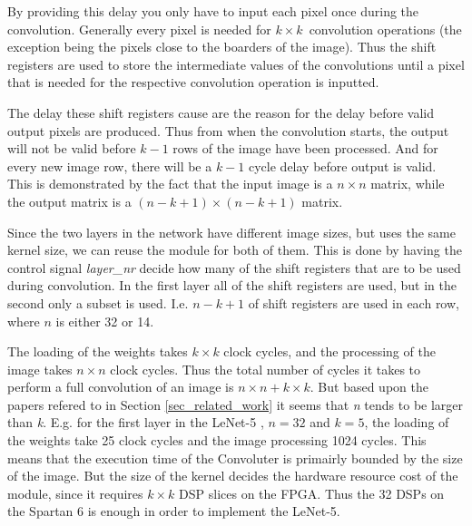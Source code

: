 By providing this delay you only have to input each pixel once during the convolution. Generally every pixel is needed for $ k \times k $ convolution operations (the exception being the pixels close to the boarders of the image). Thus the shift registers are used to store the intermediate values of the convolutions until a pixel that is needed for the respective convolution operation is inputted. 

The delay these shift registers cause are the reason for the delay before valid output pixels are produced. Thus from when the convolution starts, the output will not be valid before $ k-1 $ rows of the image have been processed. And for every new image row, there will be a $ k-1 $ cycle delay before output is valid. This is demonstrated by the fact that the input image is a $ n \times n $ matrix, while the output matrix is a $ (n-k+1) \times (n-k+1) $ matrix. 

Since the two layers in the network have different image sizes, but uses the same kernel size, we can reuse the module for both of them. This is done by having the control signal \textit{layer\_nr} decide how many of the shift registers that are to be used during convolution. In the first layer all of the shift registers are used, but in the second only a subset is used. I.e. $ n-k+1 $ of shift registers are used in each row, where $ n $ is either 32 or 14. 

The loading of the weights takes $ k \times k $ clock cycles, and the processing of the image takes $ n \times n $ clock cycles. Thus the total number of cycles it takes to perform a full convolution of an image is $ n \times n + k \times k $. But based upon the papers refered to in Section \ref{sec_related_work} it seems that \textit{n} tends to be larger than \textit{k}. E.g. for the first layer in the LeNet-5 \cite{LeCun1998}, $ n = 32 $ and $ k = 5 $, the loading  of the weights take 25 clock cycles and the image processing 1024 cycles. This means that the execution time of the Convoluter is primairly bounded by the size of the image. But the size of the kernel decides the hardware resource cost of the module, since it requires $ k \times k $ DSP slices on the FPGA. Thus the 32 DSPs on the Spartan 6 is enough in order to implement the LeNet-5. 

